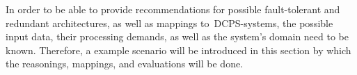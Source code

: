 In order to be able to provide recommendations for possible fault-tolerant and redundant architectures, as well as mappings to~\gls*{DCPS}-systems, the possible input data, their processing demands, as well as the system's domain need to be known.
Therefore, a example scenario will be introduced in this section by which the reasonings, mappings, and evaluations will be done.